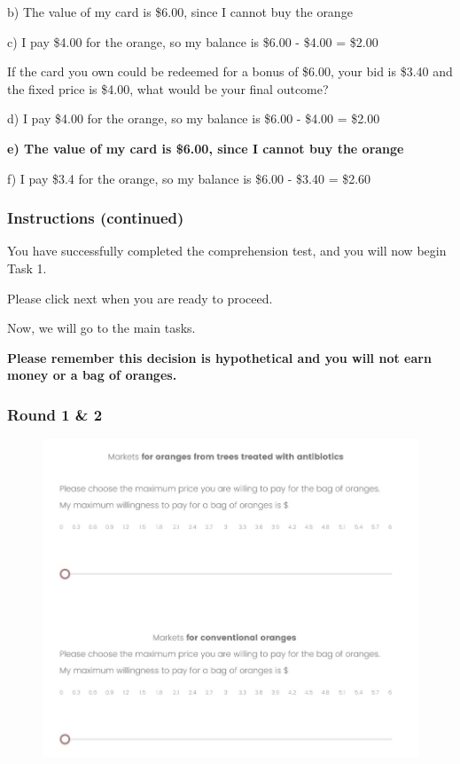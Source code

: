 \documentclass[12pt]{article}
\begin{document}
b) The value of my card is \$6.00, since I cannot buy the orange  

c) I pay \$4.00 for the orange, so my balance is \$6.00 - \$4.00 = \$2.00  

\vspace{0.5cm}

If the card you own could be redeemed for a bonus of \$6.00, your bid is \$3.40 and the fixed price is \$4.00, what would be your final outcome?  

d) I pay \$4.00 for the orange, so my balance is \$6.00 - \$4.00 = \$2.00  

\textbf{e) The value of my card is \$6.00, since I cannot buy the orange } 

f) I pay \$3.4 for the orange, so my balance is \$6.00 - \$3.40 = \$2.60  

\vspace{0.5cm}

\subsubsection*{\textbf{Instructions (continued)}}

You have successfully completed the comprehension test, and you will now begin Task 1.\par

\vspace{0.5cm}
 Please click next when you are ready to proceed.

Now, we will go to the main tasks. 

\textbf{Please remember this decision is hypothetical and you will not earn money or a bag of oranges.}

\clearpage

\subsubsection*{\centering \textbf{Round 1 \& 2}}

\begin{figure}[H]
    \centering
    \includegraphics[width=0.8\linewidth]{BDM_market.jpg}
    \caption{}
    \label{fig:BDM_market}
\end{figure}
\end{document}
